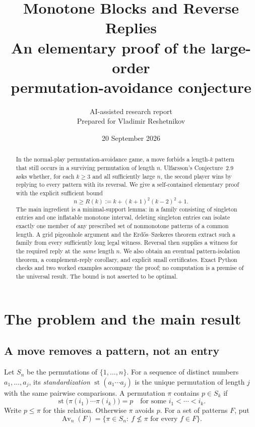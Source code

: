 \documentclass[11pt,a4paper]{article}
\title{\textbf{Monotone Blocks and Reverse Replies}\\[0.4em]
\large An elementary proof of the large-order\\permutation-avoidance conjecture}
\author{AI-assisted research report\\\small Prepared for Vladimir Reshetnikov}
\date{20 September 2026}
\theoremstyle{definition}
\theoremstyle{remark}
\DeclareMathOperator{\Av}{Av}
\DeclareMathOperator{\st}{st}
\newcommand{\replybound}{R(k)}
\begin{document}
\maketitle
\begin{abstract}
In the normal-play permutation-avoidance game, a move forbids a length-$k$
pattern that still occurs in a surviving permutation of length $n$. Ulfarsson's
Conjecture~2.9 asks whether, for each $k\ge3$ and all sufficiently large $n$,
the second player wins by replying to every pattern with its reversal.
We give a self-contained elementary proof with the explicit sufficient bound
\[
 n\ge \replybound:=k+(k+1)^2(k-2)^2+1.
\]
The main ingredient is a minimal-support lemma: in a family consisting of
singleton entries and one inflatable monotone interval, deleting singleton
entries can isolate exactly one member of any prescribed set of nonmonotone
patterns of a common length. A grid pigeonhole argument and the
Erd\H{o}s--Szekeres theorem extract such a family from every sufficiently long
legal witness. Reversal then supplies a witness for the required reply at the
\emph{same} length $n$. We also obtain an eventual pattern-isolation theorem,
a complement-reply corollary, and explicit small certificates. Exact Python
checks and two worked examples accompany the proof; no computation is a
premise of the universal result. The bound is not asserted to be optimal.
\end{abstract}

\noindent{}

\setcounter{tocdepth}{1}
\begingroup\small
\setlength{\parskip}{0pt}
\makeatletter
\renewcommand{\l@section}[2]{\@dottedtocline{1}{0em}{1.8em}{#1}{#2}}
\makeatother
\tableofcontents
\endgroup
\newpage

\section{The problem and the main result}
\label{sec:problem}

\subsection{A move removes a pattern, not an entry}
Let $S_n$ be the permutations of $\{1,\ldots,n\}$. For a sequence of distinct
numbers $a_1,\ldots,a_j$, its \emph{standardization} $\st(a_1\cdots a_j)$ is
the unique permutation of length $j$ with the same pairwise comparisons.
A permutation $\pi$ contains $p\in S_k$ if
\[
 \st\bigl(\pi(i_1)\cdots\pi(i_k)\bigr)=p
 \quad\text{for some }i_1<\cdots<i_k.
\]
Write $p\le\pi$ for this relation. Otherwise $\pi$ avoids $p$. For a set of
patterns $F$, put
\[
 \Av_n(F)=\{\pi\in S_n:\ f\nleq\pi\text{ for every }f\in F\}.
\]
\end{document}
